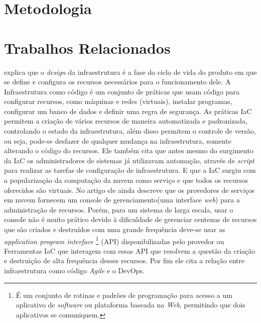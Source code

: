 \section{\esp Metodologia}







\section{\esp Trabalhos Relacionados} \label{relacionados}


 explica que o \textit{design} da infraestrutura é a fase do ciclo de vida do produto em que se define e configura os recursos necessários para o funcionamento dele. A Infraestrutura como código é um conjunto de práticas que usam código para configurar recursos, como máquinas e redes (virtuais), instalar programas, configurar um banco de dados e definir uma regra de segurança. As práticas IaC permitem a criação de vários recursos de maneira automatizada e padronizada, controlando o estado da infraestrutura, além disso permitem o controle de versão, ou seja, pode-se desfazer de qualquer mudança na infraestrutura, somente alterando o código do recursos. Ele também cita que antes mesmo do surgimento da IaC os administradores de sistemas já utilizavam automação, através de \textit{script} para realizar as tarefas de configuração de infraestrutura. E que a IaC surgiu com a popularização da computação da nuvem como serviço e que todos os recursos oferecidos são virtuais. No artigo ele ainda descreve que os provedores de serviços em nuvem fornecem um console de gerenciamento(uma interface \textit{web}) para a administração de recursos. Porém, para um sistema de larga escala, usar o console não é muito prático devido à dificuldade de gerenciar centenas de recursos que são criados e destruídos com uma grande frequência deve-se usar as \textit{application program interface} \footnote{É um conjunto de rotinas e padrões de programação para acesso a um aplicativo de \textit{software} ou plataforma baseada na \textit{Web}, permitindo que dois aplicativos se comuniquem. } (API) disponibilizadas pelo provedor ou Ferramentas IaC  que interagem com essas API que resolvem a questão da criação e destruição de alta frequência desses recursos. Por fim ele cita a relação entre infraestrutura como código \textit{Agile} e o DevOps. 

